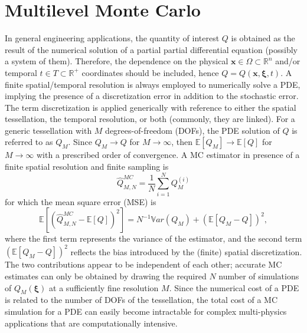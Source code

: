 \section{Multilevel Monte Carlo} \label{uq:sampling:multilevel}
In general engineering applications, the quantity of interest $Q$
is obtained as the result of the numerical solution of a partial partial differential equation (possibly a system of them).  Therefore, the dependence on the 
physical $\mathbf{x} \in \Omega\subset\mathbb{R}^n$ and/or temporal $t \in T\subset\mathbb{R^+}$ coordinates should be included, 
hence $Q=Q(\mathbf{x}, \boldsymbol{\xi}, t)$. A finite spatial/temporal resolution is always employed to numerically solve a PDE, implying
the presence of a discretization error in addition to the stochastic error. The term discretization is applied generically with reference 
to either the spatial tessellation, the temporal resolution, or both (commonly, they are linked). For a generic tessellation with $M$ 
degrees-of-freedom (DOFs), the PDE solution of $Q$ is referred to as $Q_M$. Since $Q_M \rightarrow Q$ for $M\rightarrow\infty$, 
then $\mathbb{E}\left[{Q_M}\right] \rightarrow \mathbb{E}\left[{Q}\right]$ for $M\rightarrow\infty$ with a prescribed order of convergence. 
A MC estimator in presence of a finite spatial resolution and finite sampling is
\begin{equation}
\hat{Q}^{MC}_{M,N} = \frac{1}{N} \sum_{i=1}^N Q_M^{(i)}
\end{equation}
for which the mean square error (MSE) is
\begin{equation}
\mathbb{E}\left[ (\hat{Q}^{MC}_{M,N}-\mathbb{E}\left[ Q \right] )^2 \right]
       = N^{-1} \mathbb{V}ar\left({Q_M}\right) + \left( \mathbb{E}\left[{ Q_M-Q }\right] \right)^2,
\end{equation}
where the first term represents the variance of the estimator, and the second term $\left( \mathbb{E}\left[ Q_M-Q \right] \right)^2$ reflects the bias
introduced by the (finite) spatial discretization. The two contributions appear to be independent of each other; accurate MC estimates can only be obtained by drawing the required $N$ number of simulations of $Q_M( \boldsymbol{\xi} )$ at 
a sufficiently fine resolution $M$. Since the numerical cost of a PDE is related to the number of DOFs of the tessellation,
the total cost of a MC simulation for a PDE can easily become intractable for complex multi-physics applications that are computationally 
intensive.

